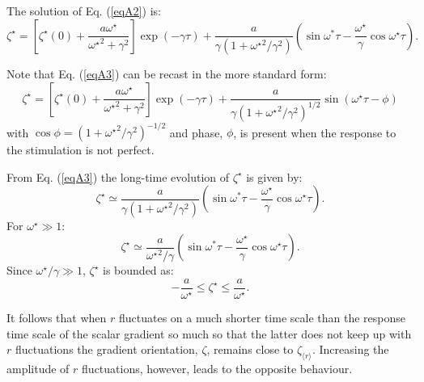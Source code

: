 \documentclass[doublespacing]{elsart}
\begin{document}
\begin{appendix}
The solution of Eq. (\ref{eqA2}) is:
\begin{equation}
\label{eqA3}
\zeta^{\star}
=
\left[
\zeta^{\star}(0) + \frac{a \omega^{\star}}{{\omega^{\star}}^2
                                           + \gamma^2}
\right]
\exp(-\gamma \tau)
+ \frac{a}{\gamma(1 + {\omega^{\star}}^2/\gamma^2)}
\left(\sin \omega^* \tau - \frac{\omega^{\star}}{\gamma} 
                      \cos \omega^{\star} \tau \right).
\end{equation}

Note that Eq. (\ref{eqA3})
can be recast in the more standard form:
\[
\zeta^{\star}
=
\left[
\zeta^{\star}(0) + \frac{a \omega^{\star}}{{\omega^{\star}}^2
                                           + \gamma^2}
\right]
\exp(-\gamma \tau)
+ \frac{a}{\gamma{(1+{\omega^{\star}}^2/\gamma^2)}^{1/2}}
  \sin(\omega^{\star} \tau - \phi)
\]
with $ \cos \phi = {(1 + {\omega^{\star}}^2/\gamma^2)}^{-1/2} $
and phase, $ \phi $, is present when the response to the
stimulation is not perfect.

From Eq. (\ref{eqA3})
the long-time evolution of $ \zeta^{\star} $ is given by:
\[
\zeta^{\star}
\simeq
\frac{a}{\gamma(1 + {\omega^{\star}}^2/\gamma^2)}
\left(\sin \omega^* \tau - \frac{\omega^{\star}}{\gamma} 
                      \cos \omega^{\star} \tau \right).
\]
For $ \omega^{\star} \gg 1 $:
\[
\zeta^{\star}
\simeq
\frac{a}{{\omega^{\star}}^2/\gamma}
\left(\sin \omega^* \tau - \frac{\omega^{\star}}{\gamma} 
                      \cos \omega^{\star} \tau \right).
\]
Since $ \omega^{\star}/\gamma \gg 1 $, 
$ \zeta^{\star} $ is bounded as:
\[
-\frac{a}{\omega^{\star}} \leq \zeta^{\star} \leq \frac{a}{\omega^{\star}}.
\]

It follows that
when $ r $ fluctuates on a much shorter time scale
than the response time scale of the scalar gradient
so much so that the latter does not keep up with
$ r $ fluctuations the gradient orientation, $ \zeta $,
remains close to $ \zeta_{\langle r \rangle} $.
Increasing the amplitude of $ r $
fluctuations, however, leads to the opposite behaviour.
\end{appendix}
\end{document}
